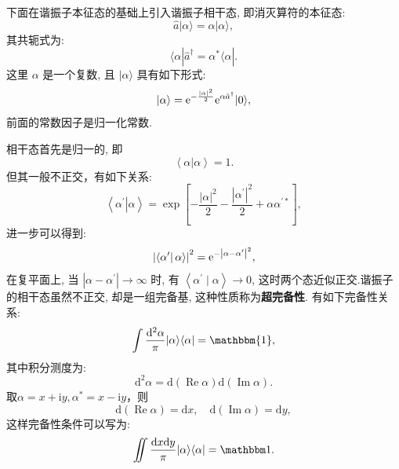 下面在谐振子本征态的基础上引入谐振子相干态, 即消灭算符的本征态:
\begin{equation}
\hat{a}|\alpha\rangle=\alpha|\alpha\rangle,
\end{equation}
其共轭式为:
\begin{equation}
\langle\alpha| \hat{a}^{\dagger}=\alpha^{*}\langle\alpha| .
\end{equation}
这里 $\alpha$ 是一个复数, 且 $|\alpha\rangle$ 具有如下形式:
\begin{equation}
|\alpha\rangle=\mathrm{e}^{-\frac{|\alpha|^{2}}{2}} \mathrm{e}^{\alpha \hat{a}^{\dagger}}|0\rangle,
\end{equation}
前面的常数因子是归一化常数. 

相干态首先是归一的, 即
\begin{equation}
\left.\left\langle\alpha \right| \alpha\right\rangle=1.
\end{equation}
但其一般不正交，有如下关系:
\begin{equation}
\left.\left\langle\alpha^{\prime} \right| \alpha\right\rangle=\exp \left[-\frac{|\alpha|^2}{2}-\frac{\left|\alpha^{\prime}\right|^{2}}{2}+\alpha \alpha^{\prime *}\right],
\end{equation}
进一步可以得到:
\begin{equation}
\left.\left|\left\langle\alpha^{\prime} \right| \alpha\right\rangle\right|^{2}=\mathrm{e}^{-\left|\alpha-\alpha^{\prime}\right|^{2}},
\end{equation}
在复平面上, 当 $\left|\alpha-\alpha^{\prime}\right| \rightarrow \infty$ 时, 有 $\left\langle\alpha^{\prime} \mid \alpha\right\rangle \rightarrow 0$, 这时两个态近似正交.谐振子的相干态虽然不正交, 却是一组完备基, 这种性质称为\textbf{超完备性}. 有如下完备性关系:
\begin{equation}
\int \frac{\mathrm{d}^{2} \alpha}{\pi}|\alpha\rangle\langle\alpha|=\mathbbm{1},
\end{equation}
其中积分测度为:
\begin{equation}
\mathrm{d}^{2} \alpha=\mathrm{d} (\operatorname{Re}\alpha) \mathrm{d} (\operatorname{Im}\alpha).
\end{equation}
取$\alpha = x+\mathrm i y,\alpha^*=x-\mathrm i y$，则
\begin{equation}
\mathrm{d} (\operatorname{Re}\alpha)=\mathrm{d} x, \quad \mathrm{d} (\operatorname{Im}\alpha)=\mathrm{d} y ,
\end{equation}
这样完备性条件可以写为:
\begin{equation}
\iint \frac{\mathrm{d} x \mathrm{d} y}{\pi}|\alpha\rangle\langle\alpha|=\mathbbm 1 .
\end{equation}

